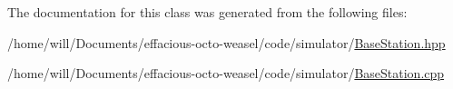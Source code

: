 The documentation for this class was generated from the following files\+:\begin{DoxyCompactItemize}
\item 
/home/will/\+Documents/effacious-\/octo-\/weasel/code/simulator/\hyperlink{_base_station_8hpp}{Base\+Station.\+hpp}\item 
/home/will/\+Documents/effacious-\/octo-\/weasel/code/simulator/\hyperlink{_base_station_8cpp}{Base\+Station.\+cpp}\end{DoxyCompactItemize}
